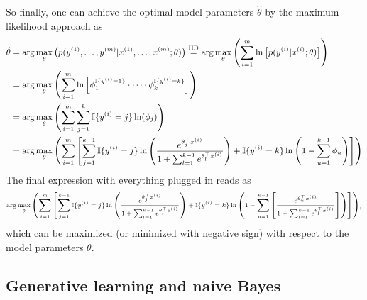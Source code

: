 \documentclass[a4paper,11pt]{article}
\numberwithin{equation}{section}
\begin{document}
{So finally, one can achieve the optimal model parameters $\hat{\theta}$ by the maximum likelihood approach as \begin{align}\small
	\begin{aligned}
		\hat{\theta} &= \arg\max_\theta\left(p(y^{(1)},\dots,y^{(m)}|x^{(1)},\dots,x^{(m)};\theta)\right) \overset{\text{IID}}{=} \arg\max_\theta\left(\sum_{i=1}^{m}\ln\left[p(y^{(i)}|x^{(i)};\theta)\right]\right) \\
		&= \arg\max_\theta\left(\sum_{i=1}^{m}\ln\left[\phi_1^{\mathbb{I}\{y^{(i)}=1\}}\cdot \dots \cdot \phi_k^{\mathbb{I}\{y^{(i)}=k\}}\right]\right) \\
		&= \arg\max_\theta\left(\sum_{i=1}^{m}\sum_{j=1}^{k}\mathbb{I}\{y^{(i)}=j\}\ln(\phi_j)\right) \\
		&= \arg\max_\theta
		\left(
		\sum_{i=1}^m
		\left[
		\sum_{j=1}^{k-1}\mathbb{I}\{y^{(i)}=j\}\ln\left(\frac{e^{\theta_j^\top x^{(i)}}}{1+\sum_{l=1}^{k-1}e^{\theta_l^\top x^{(i)}}}\right)
		+
		\mathbb{I}\{y^{(i)}=k\}\ln\left(1-\sum_{u=1}^{k-1}\phi_u
		\right)
		\right]
		\right)
	\end{aligned}
\end{align} The final expression with everything plugged in reads as \begin{gather}\scriptsize\begin{gathered}
\arg\max_\theta
\left(
\sum_{i=1}^m
\left[
\sum_{j=1}^{k-1}\mathbb{I}\{y^{(i)}=j\}\ln\left(\frac{e^{\theta_j^\top x^{(i)}}}{1+\sum_{l=1}^{k-1}e^{\theta_l^\top x^{(i)}}}\right)
+
\mathbb{I}\{y^{(i)}=k\}\ln\left(1-\sum_{u=1}^{k-1}\left[\frac{e^{\theta_u^\top x^{(i)}}}{1 + \sum_{l=1}^{k-1}e^{\theta_l^\top x^{(i)}}}\right]
\right)
\right]
\right)
\end{gathered},\end{gather}
which can be maximized (or minimized with negative sign) with respect to the model parameters $\theta$.
}

\subsection{Generative learning and naive Bayes} %



\end{document}
